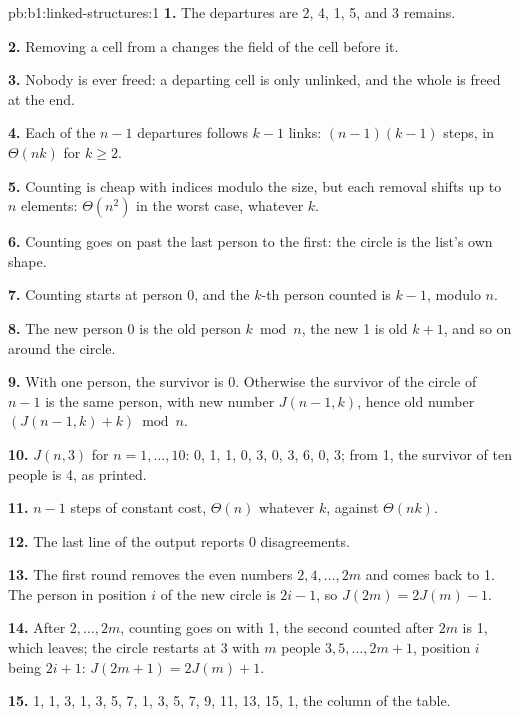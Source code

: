 \begin{solution}{pb:b1:linked-structures:1}
\textbf{1.} The departures are 2, 4, 1, 5, and 3 remains.

\textbf{2.} Removing a cell from a  changes the  field of the cell before it.

\textbf{3.} Nobody is ever freed: a departing cell is only unlinked, and the whole  is freed at the end.

\textbf{4.} Each of the $n - 1$ departures follows $k - 1$ links: $(n - 1)(k - 1)$ steps, in $\Theta(nk)$ for $k \geq 2$.

\textbf{5.} Counting is cheap with indices modulo the size, but each removal shifts up to $n$ elements: $\Theta(n^2)$ in
the worst case, whatever $k$.

\textbf{6.} Counting goes on past the last person to the first: the circle is the list's own shape.

\textbf{7.} Counting starts at person 0, and the $k$-th person counted is $k - 1$, modulo $n$.

\textbf{8.} The new person 0 is the old person $k \bmod n$, the new 1 is old $k + 1$, and so on around the circle.

\textbf{9.} With one person, the survivor is 0. Otherwise the survivor of the circle of $n - 1$ is the same person, with
new number $J(n - 1, k)$, hence old number $(J(n - 1, k) + k) \bmod n$.

\textbf{10.} $J(n, 3)$ for $n = 1, \dots, 10$: 0, 1, 1, 0, 3, 0, 3, 6, 0, 3; from 1, the survivor of ten people is 4, as
printed.

\textbf{11.} $n - 1$ steps of constant cost, $\Theta(n)$ whatever $k$, against $\Theta(nk)$.

\textbf{12.} The last line of the output reports 0 disagreements.

\textbf{13.} The first round removes the even numbers $2, 4, \dots, 2m$ and comes back to 1. The person in position
$i$ of the new circle is $2i - 1$, so $J(2m) = 2J(m) - 1$.

\textbf{14.} After $2, \dots, 2m$, counting goes on with 1, the second counted after $2m$ is 1, which leaves; the circle
restarts at 3 with $m$ people $3, 5, \dots, 2m + 1$, position $i$ being $2i + 1$: $J(2m + 1) = 2J(m) + 1$.

\textbf{15.} 1, 1, 3, 1, 3, 5, 7, 1, 3, 5, 7, 9, 11, 13, 15, 1, the column of the table.


\end{solution}
